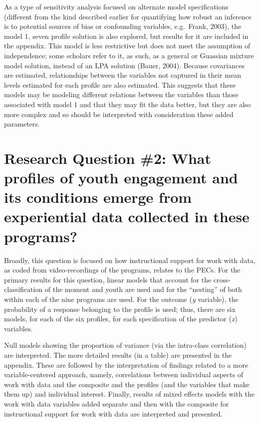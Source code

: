 \documentclass[]{msu-thesis}
\theoremstyle{definition}
\theoremstyle{definition}
\theoremstyle{definition}
\theoremstyle{remark}
\begin{document}
As a type of sensitivity analysis focused on alternate model
specifications (different from the kind described earlier for
quantifying how robust an inference is to potential sources of bias or
confounding variables, e.g.~Frank, 2003), the model 1, seven profile
solution is also explored, but results for it are included in the
appendix. This model is less restrictive but does not meet the
assumption of independence; some scholars refer to it, as such, as a
general or Guassian mixture model solution, instead of an LPA solution
(Bauer, 2004). Because covariances are estimated, relationships between
the variables not captured in their mean levels estimated for each
profile are also estimated. This suggests that these models may be
modeling different relations between the variables than those associated
with model 1 and that they may fit the data better, but they are also
more complex and so should be interpreted with consideration these added
parameters.

\section{Research Question \#2: What profiles of youth engagement and
its conditions emerge from experiential data collected in these
programs?}\label{research-question-2-what-profiles-of-youth-engagement-and-its-conditions-emerge-from-experiential-data-collected-in-these-programs}

Broadly, this question is focused on how instructional support for work
with data, as coded from video-recordings of the programs, relates to
the PECs. For the primary results for this question, linear models that
account for the cross-classification of the moment and youth are used
and for the ``nesting'' of both within each of the nine programs are
used. For the outcome (\emph{y} variable), the probability of a response
belonging to the profile is used; thus, there are six models, for each
of the six profiles, for each specification of the predictor (\emph{x})
variables.

Null models showing the proportion of variance (via the intra-class
correlation) are interpreted. The more detailed results (in a table) are
presented in the appendix. These are followed by the interpretation of
findings related to a more variable-centered approach, namely,
correlations between individual aspects of work with data and the
composite and the profiles (and the variables that make them up) and
individual interest. Finally, results of mixed effects models with the
work with data variables added separate and then with the composite for
instructional support for work with data are interpreted and presented.
\end{document}
